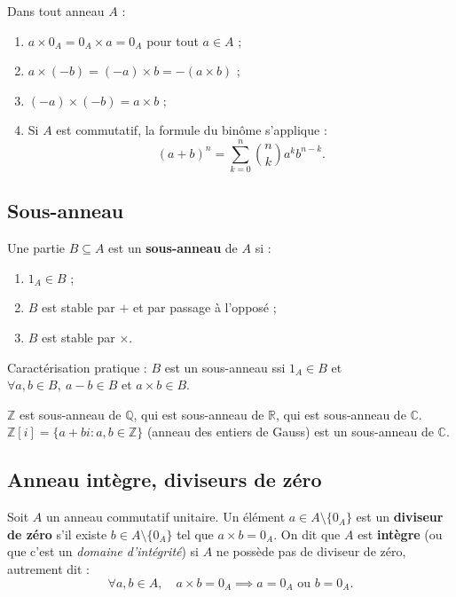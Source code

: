 \begin{proposition}
Dans tout anneau $A$ :
\begin{enumerate}
    \item $a \times 0_A = 0_A \times a = 0_A$ pour tout $a \in A$ ;
    \item $a \times (-b) = (-a) \times b = -(a \times b)$ ;
    \item $(-a) \times (-b) = a \times b$ ;
    \item Si $A$ est commutatif, la formule du binôme s'applique :
    \[ (a + b)^n = \sum_{k=0}^{n} \binom{n}{k} a^k b^{n-k}. \]
\end{enumerate}
\end{proposition}

\subsection{Sous-anneau}

\begin{definition}
Une partie $B \subseteq A$ est un \textbf{sous-anneau} de $A$ si :
\begin{enumerate}
    \item $1_A \in B$ ;
    \item $B$ est stable par $+$ et par passage à l'opposé ;
    \item $B$ est stable par $\times$.
\end{enumerate}
Caractérisation pratique : $B$ est un sous-anneau ssi $1_A \in B$ et $\forall a, b \in B,\ a - b \in B$ et $a \times b \in B$.
\end{definition}

\begin{exemple}
$\mathbb{Z}$ est sous-anneau de $\mathbb{Q}$, qui est sous-anneau de $\mathbb{R}$, qui est sous-anneau de $\mathbb{C}$.
$\mathbb{Z}[i] = \{a + bi : a, b \in \mathbb{Z}\}$ (anneau des entiers de Gauss) est un sous-anneau de $\mathbb{C}$.
\end{exemple}

\subsection{Anneau intègre, diviseurs de zéro}

\begin{definition}
Soit $A$ un anneau commutatif unitaire. Un élément $a \in A \setminus \{0_A\}$ est un \textbf{diviseur de zéro} s'il existe $b \in A \setminus \{0_A\}$ tel que $a \times b = 0_A$.
On dit que $A$ est \textbf{intègre} (ou que c'est un \emph{domaine d'intégrité}) si $A$ ne possède pas de diviseur de zéro, autrement dit :
\[ \forall a, b \in A,\quad a \times b = 0_A \implies a = 0_A \text{ ou } b = 0_A. \]
\end{definition}

